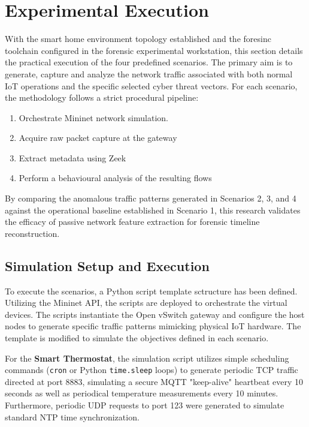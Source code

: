 \section{Experimental Execution}
With the smart home environment topology established and the foresinc toolchain configured in the forensic experimental workstation, this section details the practical execution of the four predefined scenarios. The primary aim is to generate, capture and analyze the network traffic associated with both normal IoT operations and the specific selected cyber threat vectors. For each scenario, the methodology follows a strict procedural pipeline:

\begin{enumerate}
	\item Orchestrate Mininet network simulation.
	\item Acquire raw packet capture at the gateway
	\item Extract metadata using Zeek
	\item Perform a behavioural analysis of the resulting flows
\end{enumerate}

By comparing the anomalous traffic patterns generated in Scenarios 2, 3, and 4 against the operational baseline established in Scenario 1, this research validates the efficacy of passive network feature extraction for forensic timeline reconstruction.

\subsection{Simulation Setup and Execution}
To execute the scenarios, a Python script template sctructure has been defined. Utilizing the Mininet API, the scripts are deployed to orchestrate the virtual devices. The scripts instantiate the Open vSwitch gateway and configure the host nodes to generate specific traffic patterns mimicking physical IoT hardware. The template is modified to simulate the objectives defined in each scenario.

For the \textbf{Smart Thermostat}, the simulation script utilizes simple scheduling commands (\texttt{cron} or Python \texttt{time.sleep} loops) to generate periodic TCP traffic directed at port 8883, simulating a secure MQTT "keep-alive" heartbeat every 10 seconds as well as periodical temperature measurements every 10 minutes. Furthermore, periodic UDP requests to port 123 were generated to simulate standard NTP time synchronization. 

